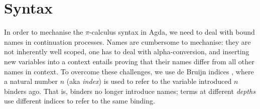 \documentclass[runningheads]{llncs}
\newcommand{\picalc}{$\pi$-calculus}
\begin{document}
\section{Syntax}
\label{syntax}

In order to mechanise the \picalc{} syntax in Agda, we need to deal with bound names in continuation processes.
Names are cumbersome to mechanise: they are not inherently well scoped, one has to deal with alpha-conversion, and inserting new variables into a context entails proving that their names differ from all other names in context.
To overcome these challenges, we use de Bruijn indices \cite{deBruijn1972}, where a natural number $n$ (aka \emph{index}) is used to refer to the variable introduced $n$ binders ago.
That is, binders no longer introduce names; terms at different \emph{depths} use different indices to refer to the same binding.
\end{document}
